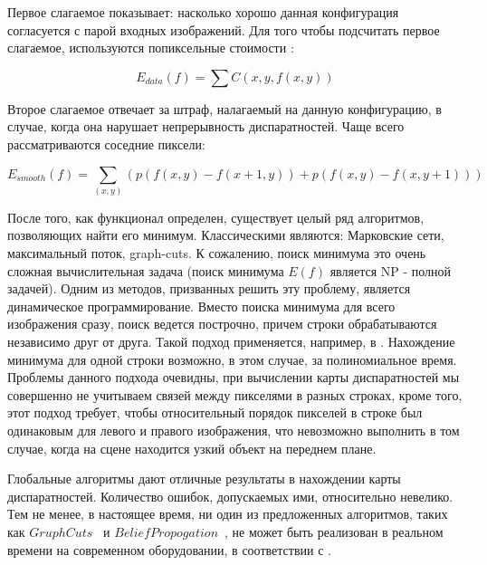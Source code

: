 Первое слагаемое показывает: насколько хорошо данная конфигурация согласуется с
парой входных изображений. Для того чтобы подсчитать первое слагаемое, используются
попиксельные стоимости :

$$E_{data}(f) = \sum {C(x,y, f(x,y))}$$

Второе слагаемое отвечает за штраф, налагаемый на данную конфигурацию, в случае,
когда она нарушает непрерывность диспаратностей. Чаще всего рассматриваются соседние
пиксели:

$$E_{smooth}(f)=\sum\limits_{(x,y)}  (p(f (x,y) - f(x+1,y)) + p (f(x,y) - f(x,y+1)))$$

После того, как функционал определен, существует целый ряд алгоритмов, позволяющих найти его минимум.
Классическими являются: Марковские сети, максимальный поток, graph-cuts.
 К сожалению, поиск минимума это очень сложная
вычислительная задача (поиск минимума $ E(f)$ является NP - полной задачей). Одним из
методов, призванных решить эту проблему, является динамическое программирование.
Вместо поиска минимума для всего изображения сразу, поиск ведется построчно, причем
строки обрабатываются независимо друг от друга. Такой подход применяется, например, в
\cite{maxlikelihood}. Нахождение минимума для одной строки возможно, в этом случае, за полиномиальное
время. Проблемы данного подхода очевидны, при вычислении карты диспаратностей мы
совершенно не учитываем связей между пикселями в разных строках, кроме того, этот
подход требует, чтобы относительный порядок пикселей в строке был одинаковым для левого
и правого изображения, что невозможно выполнить в том случае, когда на сцене находится
узкий объект на переднем плане.

Глобальные алгоритмы дают отличные результаты в нахождении карты
диспаратностей. Количество ошибок, допускаемых ими, относительно невелико. Тем не
менее, в настоящее время, ни один из предложенных алгоритмов, таких как $Gruph Cuts$~\cite{gruph_cuts} и $Belief Propogation$~\cite{belief_propogation}, не может быть реализован в
реальном времени на современном оборудовании, в соответствии с \cite{scharstein}. 


